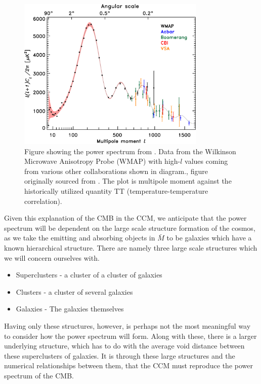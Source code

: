 \documentclass[a4paper]{article}
\begin{document}
    \begin{figure}[h]
        \centering
        \includegraphics[width=0.8\textwidth]{cmb_spectrum_ped.png}
        \caption{Figure showing the power spectrum from \cite{cmb4ped}. Data
            from the Wilkinson Microwave Anisotropy Probe (WMAP) with high-$l$
            values coming from various other collaborations shown in diagram.,
            figure originally sourced from %
            . The plot is multipole
            moment against the historically utilized quantity TT
            (temperature-temperature correlation).}
    \end{figure}

    Given this explanation of the CMB in the CCM, we anticipate that the
    power spectrum will be dependent on the large scale structure formation of
    the cosmos, as we take the emitting and absorbing objects in $\bar{M}$ to
    be galaxies which have a known hierarchical structure. There are namely
    three large scale structures which we will concern ourselves with.
    \begin{itemize}
        \item Superclusters - a cluster of a cluster of galaxies
        \item Clusters  - a cluster of several galaxies 
        \item Galaxies - The galaxies themselves
    \end{itemize}
    Having only these structures, however, is perhaps not the most meaningful
    way to consider how the power spectrum will form. Along with these, there
    is a larger underlying structure, which has to do with the average void
    distance between these superclusters of galaxies. It is through these large
    structures and the numerical relationships between them, that the CCM must
    reproduce the power spectrum of the CMB.
    
\end{document}
